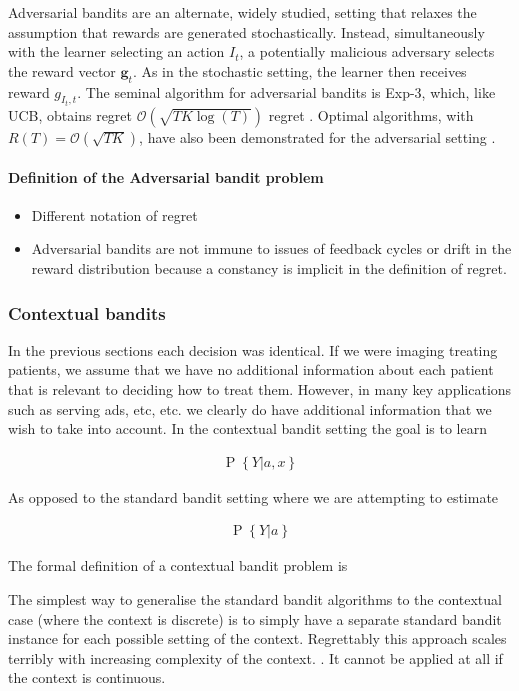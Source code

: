 \documentclass[11pt,a4paper,oneside]{book}
\newcommand{\eq}[1]{\begin{align*}#1\end{align*}}
\newcommand{\bigo}[1]{\mathcal{O}\left( #1 \right)}
\renewcommand{\P}[1]{\operatorname{P}\left\{#1\right\}}
\theoremstyle{plain}
\theoremstyle{definition}
\begin{document}
Adversarial bandits are an alternate, widely studied, setting that relaxes the assumption that rewards are generated stochastically. Instead, simultaneously with the learner selecting an action $I_t$, a potentially malicious adversary selects the reward vector $\boldsymbol{g}_t$. As in the stochastic setting, the learner then receives reward $g_{I_t,t}$. The seminal algorithm for adversarial bandits is Exp-3, which, like UCB, obtains regret $\bigo{\sqrt{TK\log(T)}}$ regret \cite{Auer1995}. Optimal algorithms, with $R(T) = \bigo{\sqrt{TK}}$, have also been demonstrated for the adversarial setting \cite{Audibert2009}.

\paragraph*{Definition of the Adversarial bandit problem}
\begin{itemize}
\item Different notation of regret
\item Adversarial bandits are not immune to issues of feedback cycles or drift in the reward distribution because a constancy is implicit in the definition of regret. 
\end{itemize}

\subsubsection{Contextual bandits}
In the previous sections each decision was identical. If we were imaging treating patients, we assume that we have no additional information about each patient that is relevant to deciding how to treat them. However, in many key applications such as serving ads, etc, etc. we clearly do have additional information that we wish to take into account. In the contextual bandit setting the goal is to learn 

\eq {
\P{Y|a,x}
} 

As opposed to the standard bandit setting where we are attempting to estimate 

\eq{
\P{Y|a}
}

The formal definition of a contextual bandit problem is

The simplest way to generalise the standard bandit algorithms to the contextual case (where the context is discrete) is to simply have a separate standard bandit instance for each possible setting of the context. Regrettably this approach scales terribly with increasing complexity of the context. . It cannot be applied at all if the context is continuous. 
\end{document}
